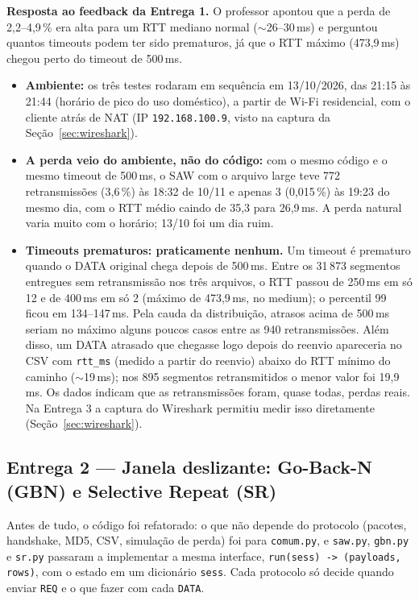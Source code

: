 \documentclass[11pt,a4paper]{article}
\newcommand{\cod}[1]{\textcolor{codverde}{\texttt{\small #1}}}
\begin{document}
\textbf{Resposta ao feedback da Entrega 1.} O professor apontou que a perda de 2,2--4,9\,\% era
alta para um RTT mediano normal ($\sim$26--30\,ms) e perguntou quantos timeouts podem ter sido
prematuros, já que o RTT máximo (473,9\,ms) chegou perto do timeout de 500\,ms.
\begin{itemize}
  \item \textbf{Ambiente:} os três testes rodaram em sequência em 13/10/2026, das 21:15 às 21:44
        (horário de pico do uso doméstico), a partir de Wi-Fi residencial,
        com o cliente atrás de NAT (IP \cod{192.168.100.9}, visto na captura da Seção~\ref{sec:wireshark}).
  \item \textbf{A perda veio do ambiente, não do código:} com o mesmo código e o mesmo timeout de
        500\,ms, o SAW com o arquivo large teve 772 retransmissões (3,6\,\%) às 18:32 de 10/11 e
        apenas 3 (0,015\,\%) às 19:23 do mesmo dia, com o RTT médio caindo de 35,3 para 26,9\,ms.
        A perda natural varia muito com o horário; 13/10 foi um dia ruim.
  \item \textbf{Timeouts prematuros: praticamente nenhum.} Um timeout é prematuro quando o DATA
        original chega depois de 500\,ms. Entre os 31\,873 segmentos entregues sem retransmissão nos
        três arquivos, o RTT passou de 250\,ms em só 12 e de 400\,ms em só 2 (máximo de 473,9\,ms, no
        medium); o percentil 99 ficou em 134--147\,ms. Pela cauda da distribuição, atrasos acima de
        500\,ms seriam no máximo alguns poucos casos entre as 940 retransmissões. Além disso, um DATA
        atrasado que chegasse logo depois do reenvio apareceria no CSV com \cod{rtt\_ms} (medido a
        partir do reenvio) abaixo do RTT mínimo do caminho ($\sim$19\,ms); nos 895 segmentos
        retransmitidos o menor valor foi 19,9\,ms. Os dados indicam que as retransmissões foram,
        quase todas, perdas reais. Na Entrega 3 a captura do Wireshark permitiu medir isso
        diretamente (Seção~\ref{sec:wireshark}).
\end{itemize}

\subsection{Entrega 2 --- Janela deslizante: Go-Back-N (GBN) e Selective Repeat (SR)}\label{sec:e2}

Antes de tudo, o código foi refatorado: o que não depende do protocolo (pacotes, handshake, MD5, CSV,
simulação de perda) foi para \cod{comum.py}, e \cod{saw.py}, \cod{gbn.py} e \cod{sr.py} passaram a
implementar a mesma interface, \cod{run(sess) -> (payloads, rows)}, com o estado em um dicionário
\cod{sess}. Cada protocolo só decide quando enviar \cod{REQ} e o que fazer com cada \cod{DATA}.
\end{document}
